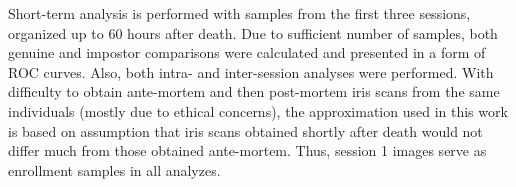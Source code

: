\documentclass[10pt,twocolumn,letterpaper]{article}
\begin{document}
Short-term analysis is performed with samples from the first three sessions, organized up to 60 hours after death. Due to sufficient number of samples, both genuine and impostor comparisons were calculated and presented in a form of ROC curves. Also, both intra- and inter-session analyses were performed. With difficulty to obtain ante-mortem and then post-mortem iris scans from the same individuals (mostly due to ethical concerns), the approximation used in this work is based on assumption that iris scans obtained shortly after death would not differ much from those obtained ante-mortem. Thus, session 1 images serve as enrollment samples in all analyzes.


%
%
\end{document}
